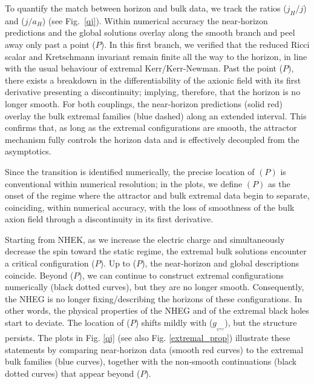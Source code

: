 \documentclass[11pt]{article}
\numberwithin{equation}{section} %
\begin{document}
To quantify the match between horizon and bulk data, we track the ratios ($j_H/j$) and ($j/a_H$) (see Fig.~\ref{qj}). Within numerical accuracy the near‑horizon predictions and the global solutions overlay along the smooth branch and peel away only past a point ($P$). In this first branch, we verified that the reduced Ricci scalar and Kretschmann invariant remain finite all the way to the horizon, in line with the usual behaviour of extremal Kerr/Kerr-Newman. Past the point ($P$), there exists a breakdown in the differentiability of the axionic field with its first derivative presenting a discontinuity; implying, therefore, that the horizon is no longer smooth. For both couplings, the near‑horizon predictions (solid red) overlay the bulk extremal families (blue dashed) along an extended interval. This confirms that, as long as the extremal configurations are smooth, the attractor mechanism fully controls the horizon data and is effectively decoupled from the asymptotics.

 {Since the transition is identified numerically, the precise location of $(P)$ is conventional within numerical resolution; in the plots, we define $(P)$ as the onset of the regime where the attractor and bulk extremal data begin to separate, coinciding, within numerical accuracy, with the loss of smoothness of the bulk axion field through a discontinuity in its first derivative.}



 Starting from NHEK, as we increase the electric charge and simultaneously decrease the spin toward the static regime, the extremal bulk solutions encounter a critical configuration ($P$). Up to ($P$), the near‑horizon and global descriptions coincide. Beyond ($P$), we can continue to construct extremal configurations numerically  (black dotted curves), but they are no longer smooth. Consequently, the NHEG is no longer fixing/describing the horizons of these configurations. In other words, the physical properties of the NHEG and of the extremal black holes start to deviate. The location of ($P$) shifts mildly with ($g_{_{\psi\gamma\gamma}}$), but the structure persists. The plots in Fig. \ref{qj} (see also Fig. \ref{extremal_prop}) illustrate these statements by comparing near‑horizon data (smooth red curves) to the extremal bulk families (blue curves), together with the non‑smooth continuations (black dotted curves) that appear beyond ($P$).  
\end{document}

